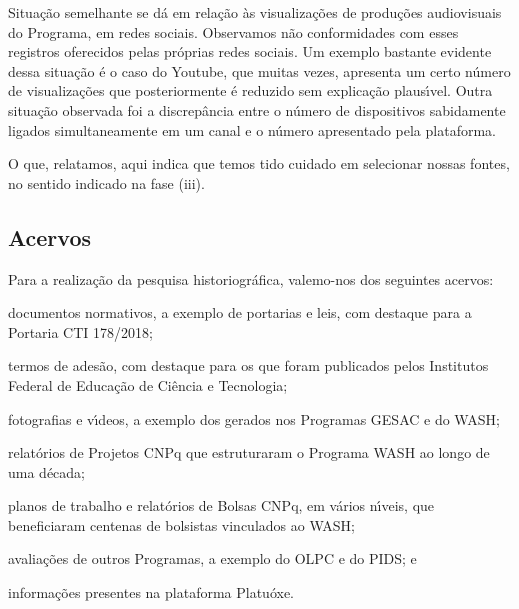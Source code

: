 \documentclass[
12pt,		%
openright,	%
twoside,  %
a4paper,			%
chapter=TITLE,		%
english,			%
french,				%
spanish,			%
brazil				%
]{USPSC-classe/USPSC}
\begin{document}
Situa\c{c}\~ao semelhante se d\'a em rela\c{c}\~ao \`as visualiza\c{c}\~oes de produ\c{c}\~oes audiovisuais do Programa, em redes sociais. Observamos n\~ao conformidades com esses registros oferecidos pelas pr\'oprias redes sociais. Um exemplo bastante evidente dessa situa\c{c}\~ao \'e o caso do Youtube, que muitas vezes, apresenta um certo n\'umero de visualiza\c{c}\~oes que posteriormente \'e reduzido sem explica\c{c}\~ao plaus\'{\i}vel. Outra situa\c{c}\~ao observada foi a discrep\^ancia entre o n\'umero de dispositivos sabidamente ligados simultaneamente em um canal e o n\'umero apresentado pela plataforma.









O que, relatamos, aqui indica que temos tido cuidado em selecionar nossas fontes, no sentido indicado na fase (iii).









\subsection[Acervos]{Acervos}\label{Acervos}
Para a realiza\c{c}\~ao da pesquisa historiogr\'afica, valemo-nos dos seguintes acervos:










\begin{alineas}
\item documentos normativos, a exemplo de portarias e leis, com destaque para a Portaria CTI 178/2018;
\item termos de ades\~ao, com destaque para os que foram publicados pelos  Institutos Federal de Educa\c{c}\~ao de Ci\^encia e Tecnologia;
\item fotografias e v\'{\i}deos, a exemplo dos gerados nos Programas GESAC e do WASH;
\item relat\'orios de Projetos CNPq que estruturaram o Programa WASH ao longo de uma d\'ecada;
\item planos de trabalho e relat\'orios de Bolsas CNPq, em v\'arios n\'{\i}veis, que beneficiaram centenas de bolsistas vinculados ao WASH;
\item avalia\c{c}\~oes de outros Programas, a exemplo do OLPC e do PIDS; e
\item informa\c{c}\~oes presentes na plataforma Platu\'oxe.
\end{alineas}
\end{document}
